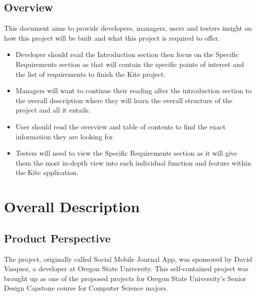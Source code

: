 \documentclass[letterpaper, 10, draftclsnofoot, onecolumn]{IEEEtran}
\begin{document}
\subsection{Overview}
This document aims to provide developers, managers, users and testers insight on how this project will be built and what this project is required to offer. 
\begin{itemize}
\item Developer should read the Introduction section then focus on the Specific Requirements section as that will contain the specific points of interest and the list of requirements to finish the Kite project.
\item Managers will want to continue their reading after the introduction section to the overall description where they will learn the overall structure of the project and all it entails.
\item User should read the overview and table of contents to find the exact information they are looking for.
\item Testers will need to view the Specific Requirements section as it will give them the most in-depth view into each individual function and feature within the Kite application.
\end{itemize}



\section{Overall Description}

\subsection{Product Perspective}
\indent The project, originally called Social Mobile Journal App, was sponsored by David Vasquez, a developer at Oregon State University. This self-contained project was brought up as one of the proposed projects for Oregon State University's Senior Design Capstone course for Computer Science majors. 
\end{document}
